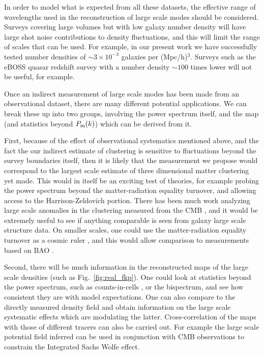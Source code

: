 \documentclass[prd,amsmath,amssymb,floatfix,superscriptaddress,nofootinbib,twocolumn]{revtex4-1}
\newcommand{\rf}[1]{\ref{fig:#1}}
\begin{document}
In order to model what is expected from all these datasets, the effective range of wavelengths used in the reconstruction of large scale modes should be considered. Surveys covering large volumes but with low galaxy number density will have large shot noise contributions to density fluctuations, and this will limit the range of scales that can be used. For example, in our present work we have successfully tested number densities of $\sim 3\times10^{-3}$ galaxies per (Mpc/h)$^{3}$. Surveys such as the eBOSS quasar redshift survey \cite{Ata:2017dya} with a number density $\sim 100$ times lower will not be useful, for example.

Once an indirect measurement of large scale modes has been made from an observational dataset, there are many different potential applications. We can break these up into two groups, involving the power spectrum itself, and the map (and statistics beyond $P_{\rm m}(k)$) which can be derived from it.

First, because of the effect of observational systematics mentioned above, and the fact the our indirect estimate of clustering is sensitive to fluctuations beyond the survey boundaries itself, then it is likely that the measurement we propose would correspond to the largest scale estimate of three dimensional matter clustering yet made. This would in itself be an exciting test of theories, for example probing the power spectrum beyond the matter-radiation equality turnover, and allowing access to the Harrison-Zeldovich portion. There has been much work analyzing large scale anomalies in the clustering measured from the CMB \cite{Copi:2010na}\cite{Rassat:2014yna}\cite{Schwarz:2015cma}, and it would be extremely useful to see if anything comparable is seen from galaxy large scale structure data. On smaller scales, one could use the matter-radiation equality turnover as a cosmic ruler \cite{Hasenkamp:2012ii}, and this would allow comparison to measurements based on BAO \cite{Lazkoz:2007cc}.

Second, there will be much information in the reconstructed maps of the large scale densities (such as Fig.~\rf{real_fkp}). One could look at statistics beyond the power spectrum, such as counts-in-cells \cite{Yang:2011cic}, or the bispectrum, and see how consistent they are with model expectations. One can also compare to the directly measured density field and obtain information on the large scale systematic effects which are modulating the latter. Cross-correlation of the maps with those of different tracers can also be carried out. For example the large scale potential field inferred can be used in conjunction with CMB observations to constrain the Integrated Sachs Wolfe effect\cite{Nishizawa:2014vga}.
\end{document}

